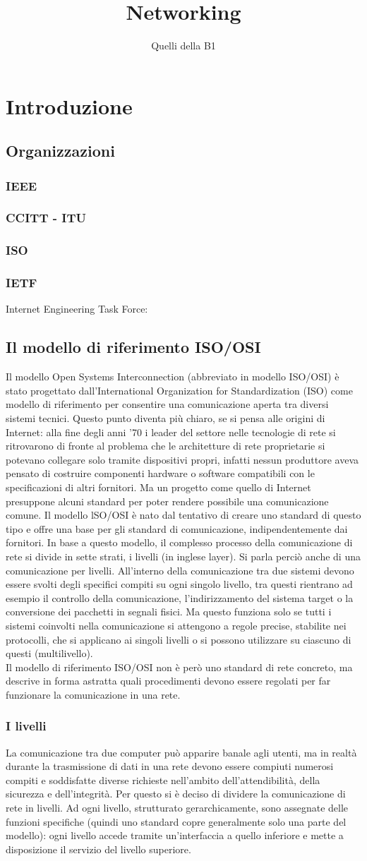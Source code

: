\documentclass[a4paper,11pt]{article}
\author{Quelli della B1}
\title{Networking}
\def\sub#1{\subsection{#1}\label{#1}}
\def\subsub#1{\subsubsection{#1}\label{#1}}
\begin{document}
\maketitle
\newpage
\tableofcontents
\newpage

\section*{Introduzione}
\sub{Organizzazioni}
\subsub{IEEE}
\subsub{CCITT - ITU}
\subsub{ISO}
\subsub{IETF}
Internet Engineering Task Force:
\sub{Il modello di riferimento ISO/OSI}
Il modello Open Systems Interconnection (abbreviato in modello ISO/OSI) è stato progettato dall’International Organization for Standardization (ISO) come modello di riferimento per consentire una comunicazione aperta tra diversi sistemi tecnici. Questo punto diventa più chiaro, se si pensa alle origini di Internet: alla fine degli anni ’70 i leader del settore nelle tecnologie di rete si ritrovarono di fronte al problema che le architetture di rete proprietarie si potevano collegare solo tramite dispositivi propri, infatti nessun produttore aveva pensato di costruire componenti hardware o software compatibili con le specificazioni di altri fornitori. Ma un progetto come quello di Internet presuppone alcuni standard per poter rendere possibile una comunicazione comune.
Il modello lSO/OSI è nato dal tentativo di creare uno standard di questo tipo e offre una base per gli standard di comunicazione, indipendentemente dai fornitori. In base a questo modello, il complesso processo della comunicazione di rete si divide in sette strati, i livelli (in inglese layer). Si parla perciò anche di una comunicazione per livelli. All’interno della comunicazione tra due sistemi devono essere svolti degli specifici compiti su ogni singolo livello, tra questi rientrano ad esempio il controllo della comunicazione, l’indirizzamento del sistema target o la conversione dei pacchetti in segnali fisici. Ma questo funziona solo se tutti i sistemi coinvolti nella comunicazione si attengono a regole precise, stabilite nei protocolli, che si applicano ai singoli livelli o si possono utilizzare su ciascuno di questi (multilivello).
\\Il modello di riferimento ISO/OSI non è però uno standard di rete concreto, ma descrive in forma astratta quali procedimenti devono essere regolati per far funzionare la comunicazione in una rete.  
\subsub{I livelli}
La comunicazione tra due computer può apparire banale agli utenti, ma in realtà durante la trasmissione di dati in una rete devono essere compiuti numerosi compiti e soddisfatte diverse richieste nell’ambito dell’attendibilità, della sicurezza e dell’integrità. Per questo si è deciso di dividere la comunicazione di rete in livelli. Ad ogni livello, strutturato gerarchicamente, sono assegnate delle funzioni specifiche (quindi uno standard copre generalmente solo una parte del modello): ogni livello accede tramite un’interfaccia a quello inferiore e mette a disposizione il servizio del livello superiore.
\end{document}
